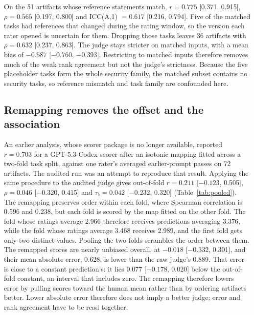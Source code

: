 On the 51 artifacts whose reference statements match, $r=0.775$ [0.371, 0.915], $\rho=0.565$ [0.197, 0.800] and ICC(A,1) $=0.617$ [0.216, 0.794].
Five of the matched tasks had references that changed during the rating window, so the version each rater opened is uncertain for them.
Dropping those tasks leaves 36 artifacts with $\rho=0.632$ [0.237, 0.863].
The judge stays stricter on matched inputs, with a mean bias of $-0.587$ [$-0.760$, $-0.393$].
Restricting to matched inputs therefore removes much of the weak rank agreement but not the judge's strictness.
Because the five placeholder tasks form the whole security family, the matched subset contains no security tasks, so reference mismatch and task family are confounded here.

\subsection{Remapping removes the offset and the association}
An earlier analysis, whose scorer package is no longer available, reported $r=0.703$ for a GPT-5.3-Codex scorer after an isotonic mapping fitted across a two-fold task split, against one rater's averaged earlier-prompt passes on 72 artifacts.
The audited run was an attempt to reproduce that result.
Applying the same procedure to the audited judge gives out-of-fold $r=0.211$ [$-0.123$, 0.505], $\rho=0.046$ [$-0.320$, 0.415] and $\tau_b=0.042$ [$-0.232$, 0.320] (Table~\ref{tab:pooled}).
The remapping preserves order within each fold, where Spearman correlation is 0.596 and 0.238, but each fold is scored by the map fitted on the other fold.
The fold whose ratings average 2.966 therefore receives predictions averaging 3.376, while the fold whose ratings average 3.468 receives 2.989, and the first fold gets only two distinct values.
Pooling the two folds scrambles the order between them.
The remapped scores are nearly unbiased overall, at $-0.018$ [$-0.332$, 0.301], and their mean absolute error, 0.628, is lower than the raw judge's 0.889.
That error is close to a constant prediction's: it lies 0.077 [$-0.178$, 0.020] below the out-of-fold constant, an interval that includes zero.
The remapping therefore lowers error by pulling scores toward the human mean rather than by ordering artifacts better.
Lower absolute error therefore does not imply a better judge; error and rank agreement have to be read together.
